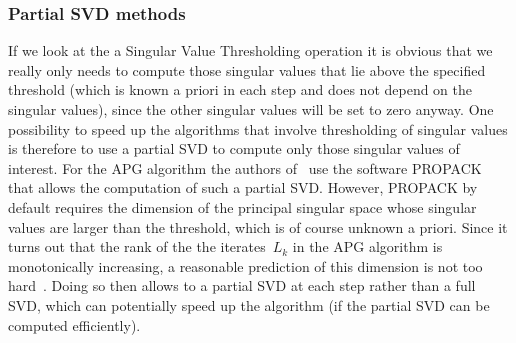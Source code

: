 \subsubsection{Partial SVD methods}
\label{Algorithms:Discussion:SVD:PartialSVD:Subsubsec}

If we look at the a Singular Value Thresholding operation it is obvious that we really only needs to compute those singular values that lie above the specified threshold (which is known a priori in each step and does not depend on the singular values), since the other singular values will be set to zero anyway. One possibility to speed up the algorithms that involve thresholding of singular values is therefore to use a partial SVD to compute only those singular values of interest. For the APG algorithm the authors of~\cite{Lin:2010fk} use the software PROPACK that allows the computation of such a partial SVD. However, PROPACK by default requires the dimension of the principal singular space whose singular values are larger than the threshold, which is of course unknown a priori. Since it turns out that the rank of the the iterates~$L_k$ in the APG algorithm is monotonically increasing, a reasonable prediction of this dimension is not too hard~\cite{Lin:2010fk}. Doing so then allows to a partial SVD at each step rather than a full SVD, which can potentially speed up the algorithm (if the partial SVD can be computed efficiently). 

